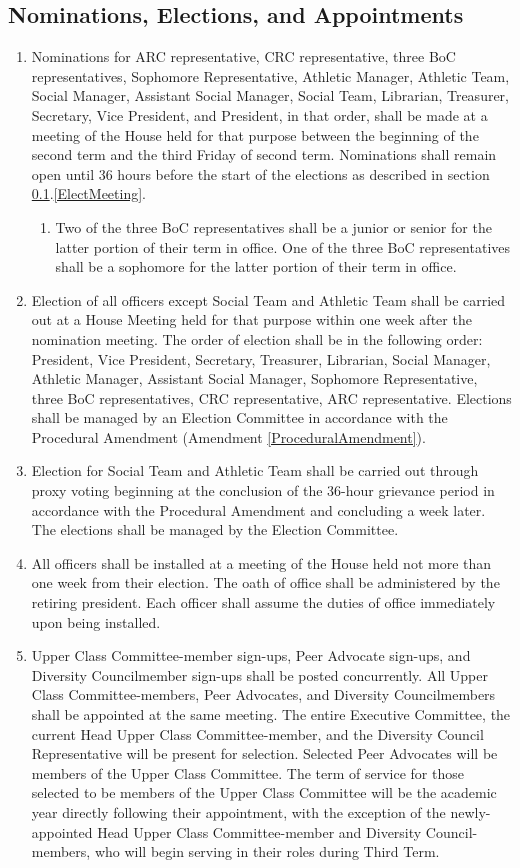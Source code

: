\documentclass[10pt]{article} %
\begin{document}
\subsection{Nominations, Elections, and Appointments}
\label{NomsElects}
\begin{enumerate}
\item Nominations for ARC representative, CRC representative, three BoC representatives, Sophomore Representative, Athletic Manager, Athletic Team, Social Manager, Assistant Social Manager, Social Team, Librarian, Treasurer, Secretary, Vice President, and President, in that order, shall be made at a meeting of the House held for that purpose between the beginning of the second term and the third Friday of second term. Nominations shall remain open until 36 hours before the start of the elections as described in section \ref{NomsElects}.\ref{ElectMeeting}.
\begin{enumerate}
	\item Two of the three BoC representatives shall be a junior or senior for the latter portion of their term in office. One of the three BoC representatives shall be a sophomore for the latter portion of their term in office.
\end{enumerate}
\item \label{ElectMeeting} Election of all officers except Social Team and Athletic Team shall be carried out at a House Meeting held for that purpose within one week after the nomination meeting. The order of election shall be in the following order: President, Vice President, Secretary, Treasurer, Librarian, Social Manager, Athletic Manager, Assistant Social Manager, Sophomore Representative, three BoC representatives, CRC representative, ARC representative. Elections shall be managed by an Election Committee in accordance with the Procedural Amendment (Amendment \ref{ProceduralAmendment}).
\item Election for Social Team and Athletic Team shall be carried out through proxy voting beginning at the conclusion of the 36-hour grievance period in accordance with the Procedural Amendment and concluding a week later. The elections shall be managed by the Election Committee.
\item All officers shall be installed at a meeting of the House held not more than one week from their election. The oath of office shall be administered by the retiring president. Each officer shall assume the duties of office immediately upon being installed.
\item Upper Class Committee-member sign-ups, Peer Advocate sign-ups, and Diversity Councilmember sign-ups shall be posted concurrently. All Upper Class Committee-members, Peer Advocates, and Diversity Councilmembers shall be appointed at the same meeting. The entire Executive Committee, the current Head Upper Class Committee-member, and the Diversity Council Representative will be present for selection. Selected Peer Advocates will be members of the Upper Class Committee. The term of service for those selected to be members of the Upper Class Committee will be the academic year directly following their appointment, with the exception of the newly-appointed Head Upper Class Committee-member and Diversity Council-members, who will begin serving in their roles during Third Term.

\end{enumerate}
\end{document}
